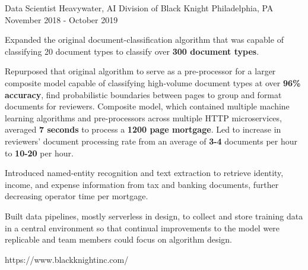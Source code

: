 \begin{cventries}

\cventrylink
{Data Scientist}
{Heavywater, AI Division of Black Knight}
{Philadelphia, PA}
{November 2018 - October 2019} %
{ %
\begin{cvitems}
\item{Expanded the original document-classification algorithm that was capable of classifying 20 document types to classify over \textbf{300 document types}.}
\item{Repurposed that original algorithm to serve as a pre-processor for a larger composite model capable of classifying high-volume document types at over \textbf{96\% accuracy}, find probabilistic boundaries between pages to group and format documents for reviewers. Composite model, which contained multiple machine learning algorithms and pre-processors across multiple HTTP microservices, averaged \textbf{7 seconds} to process a \textbf{1200 page mortgage}. Led to increase in reviewers' document processing rate from an average of \textbf{3-4} documents per hour to \textbf{10-20} per hour.}
\item{Introduced named-entity recognition and text extraction to retrieve identity, income, and expense information from tax and banking documents, further decreasing operator time per mortgage.}
\item{Built data pipelines, mostly serverless in design, to collect and store training data in a central environment so that continual improvements to the model were replicable and team members could focus on algorithm design.}
\end{cvitems}
}
{https://www.blackknightinc.com/}


\end{cventries}
